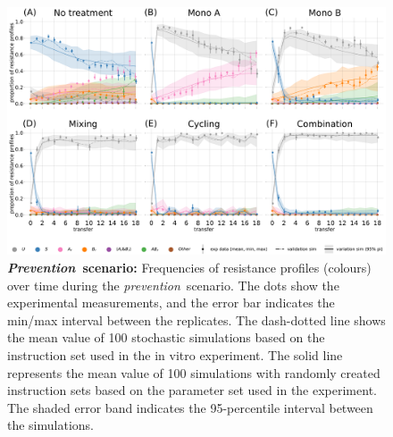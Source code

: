 \begin{figure}[p]
    \vspace{5cm} 
     \centering
     \includegraphics[width=\linewidth]{supplementary_1/figures/20210417_timeplot.pdf}
     \caption{\textbf{\textit{Prevention}~scenario:}
     Frequencies of resistance profiles (colours) over time during the \textit{prevention}~scenario. 
     The dots show the experimental measurements, and the error bar indicates the min/max interval between the replicates. 
     The dash-dotted line shows the mean value of 100 stochastic simulations based on the instruction set used in the in vitro experiment. 
     The solid line represents the mean value of 100 simulations with randomly created instruction sets based on the parameter set used in the experiment. 
     The shaded error band indicates the 95-percentile interval between the simulations.}
     \label{fig:exp1}
\end{figure}



